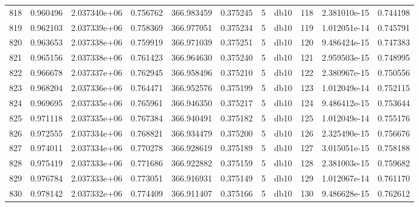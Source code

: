 \begin{tabular}{lrrrrrrlrrr}
818  &    0.960496 &        2.037340e+06 &  0.756762 &              366.983459 &    0.375245 &       5 &         db10 &    118 &   2.381010e-15 &      0.744198 \\
819  &    0.962103 &        2.037339e+06 &  0.758369 &              366.977051 &    0.375234 &       5 &         db10 &    119 &   1.012051e-14 &      0.745791 \\
820  &    0.963653 &        2.037338e+06 &  0.759919 &              366.971039 &    0.375251 &       5 &         db10 &    120 &   9.486424e-15 &      0.747383 \\
821  &    0.965156 &        2.037338e+06 &  0.761423 &              366.964630 &    0.375240 &       5 &         db10 &    121 &   2.959503e-15 &      0.748995 \\
822  &    0.966678 &        2.037337e+06 &  0.762945 &              366.958496 &    0.375210 &       5 &         db10 &    122 &   2.380967e-15 &      0.750556 \\
823  &    0.968204 &        2.037336e+06 &  0.764471 &              366.952576 &    0.375199 &       5 &         db10 &    123 &   1.012049e-14 &      0.752115 \\
824  &    0.969695 &        2.037335e+06 &  0.765961 &              366.946350 &    0.375217 &       5 &         db10 &    124 &   9.486412e-15 &      0.753644 \\
825  &    0.971118 &        2.037335e+06 &  0.767384 &              366.940491 &    0.375182 &       5 &         db10 &    125 &   1.012049e-14 &      0.755176 \\
826  &    0.972555 &        2.037334e+06 &  0.768821 &              366.934479 &    0.375200 &       5 &         db10 &    126 &   2.325490e-15 &      0.756676 \\
827  &    0.974011 &        2.037334e+06 &  0.770278 &              366.928619 &    0.375189 &       5 &         db10 &    127 &   3.015051e-15 &      0.758188 \\
828  &    0.975419 &        2.037333e+06 &  0.771686 &              366.922882 &    0.375159 &       5 &         db10 &    128 &   2.381003e-15 &      0.759682 \\
829  &    0.976784 &        2.037333e+06 &  0.773051 &              366.916931 &    0.375149 &       5 &         db10 &    129 &   1.012067e-14 &      0.761170 \\
830  &    0.978142 &        2.037332e+06 &  0.774409 &              366.911407 &    0.375166 &       5 &         db10 &    130 &   9.486628e-15 &      0.762612 \\

\end{tabular}
